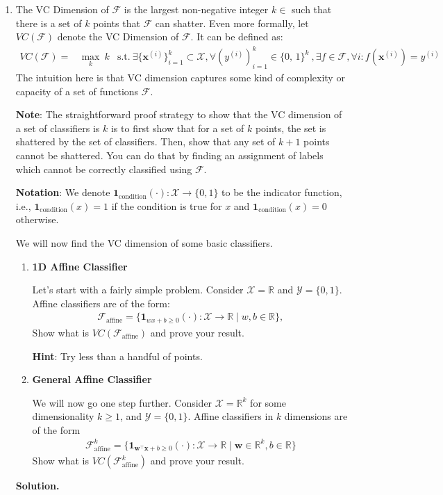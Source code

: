 \documentclass{article}
\newenvironment{Q}
        {%
          \clearpage
          \item
        }
        {%
          \phantom{s} %
          \bigskip
          \textbf{Solution.}
        }
\begin{document}
\begin{enumerate}[font={\Large\bfseries},left=0pt]
\begin{Q}
\begin{enumerate}
  The VC Dimension of $\mathcal{F}$ is the largest non-negative integer $k\in $ such that there is a set of $k$ points that $\mathcal{F}$ can shatter.
  Even more formally, let $VC(\mathcal{F})$ denote the VC Dimension of $\mathcal{F}$. It can be defined as:
  \begin{align}
      VC(\mathcal{F}) = &\max_{k} \ k
      &\text{s.t.}\ \exists \{\bm{x}^{(i)}\}_{i=1}^{k}\subset \mathcal{X}, \forall (y^{(i)})_{i=1}^{k} \in \text{\{0, 1\}}^k\ ,\exists f\in\mathcal{F}, \forall i: f(\bm{x}^{(i)})=y^{(i)}
  \end{align}
  The intuition here is that VC dimension captures some kind of complexity or capacity of a set of functions $\mathcal{F}$.
  
  \textbf{Note}: The straightforward proof strategy to show that the VC dimension of a set of classifiers is $k$ is to first show that for a set of $k$ points, the set is shattered by the set of classifiers. Then, show that any set of $k+1$ points cannot be shattered. You can do that by finding an assignment of labels which cannot be correctly classified using $\mathcal{F}$.
  
  \textbf{Notation}: We denote $\bm{1}_{\text{condition}}(\cdot):\mathcal{X}\to \{0, 1\}$ to be the indicator function, i.e., $\bm{1}_{\text{condition}}(x)=1$ if the condition is true for $x$ and $\bm{1}_{\text{condition}}(x)=0$ otherwise. 
  
  
  We will now find the VC dimension of some basic classifiers.
  
  \begin{enumerate}
      \item \textbf{1D Affine Classifier}
      
  Let's start with a fairly simple problem. Consider $\mathcal{X}=\mathbb{R}$ and $\mathcal{Y}=\{0, 1\}$. Affine classifiers are of the form:
  \begin{align}
      \mathcal{F}_\text{affine} = {\{ \bm{1}_{wx + b \geq 0}(\cdot):\mathcal{X}\to \mathbb{R} \mid w,b\in \mathbb{R}\}},
  \end{align}
  Show what is $VC(\mathcal{F}_\text{affine})$ and prove your result. 
  
  \textbf{Hint}: Try less than a handful of points.
  
  \item \textbf{General Affine Classifier}
  
  We will now go one step further. Consider $\mathcal{X}=\mathbb{R}^k$ for some dimensionality $k\geq 1$, and $\mathcal{Y}=\{0, 1\}$. Affine classifiers in $k$ dimensions are of the form
  \begin{align}
      \mathcal{F}^k_\text{affine} = {\{ \textbf{1}_{ \bm{w}^\top \bm{x} + b \geq 0}(\cdot):\mathcal{X}\to \mathbb{R}\mid \bm{w}\in \mathbb{R}^k,b\in \mathbb{R} \}}
  \end{align}
  Show what is $VC(\mathcal{F}^k_\text{affine})$ and prove your result.
  

\end{enumerate}
\end{enumerate}
\end{Q}
\end{enumerate}
\end{document}
